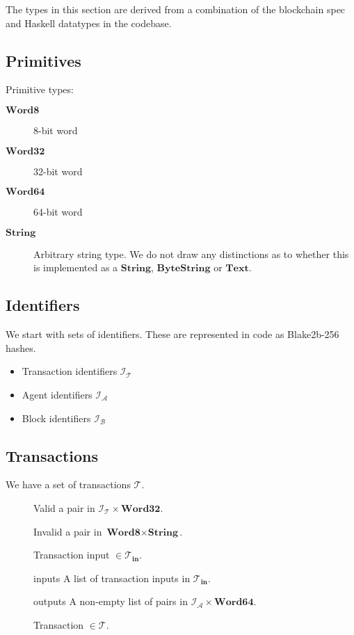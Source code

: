 \documentclass{article}
\newcommand{\idsof}[1]{\mathcal{I}\!_#1}
\newcommand{\txs}{\mathcal{T}}
\newcommand{\blocks}{\mathcal{B}}
\newcommand{\txins}{\txs_{\textbf{in}}}
\newcommand{\txids}{\idsof{\txs}}
\newcommand{\blockids}{\idsof{\blocks}}
\newcommand{\agentids}{\idsof{\mathcal{A}}}
\newcommand{\hstype}[1]{\textbf{#1}}
\newcommand{\String}{\hstype{String}}
\newcommand{\Word}[1]{\hstype{Word#1}}
\begin{document}
The types in this section are derived from a combination of the blockchain spec
and Haskell datatypes in the codebase.

\subsection{Primitives}

Primitive types:

\begin{description}
\item [$\Word{8}$] 8-bit word
\item [$\Word{32}$] 32-bit word
\item [$\Word{64}$] 64-bit word
\item [$\String$] Arbitrary string type. We do not draw any distinctions as to
  whether this is implemented as a $\hstype{String}$, $\hstype{ByteString}$ or
  $\hstype{Text}$.
\end{description}

\subsection{Identifiers}

We start with sets of identifiers. These are represented in code as Blake2b-256
hashes.

\begin{itemize}
\item{Transaction identifiers $\txids$}
\item{Agent identifiers $\agentids$}
\item{Block identifiers $\blockids$}
\end{itemize}

\subsection{Transactions}

We have a set of transactions $\txs$.

\begin{figure}[H]
\caption{Transaction input $\in \txins$.}
\label{fig:txin}
\begin{variant}
  \item [Valid] a pair in $\txids\times\Word{32}$.
  \item [Invalid] a pair in $\Word{8}\times\String$.
\end{variant}
\end{figure}

\begin{figure}[H]
  \caption{Transaction $\in\txs$.}
  \label{fig:transaction}
  \begin{record}
    \item[inputs] A list of transaction inputs in $\txins$.
    \item[outputs] A non-empty list of pairs in $\agentids\times\Word{64}$.
  \end{record}
\end{figure}
\end{document}
